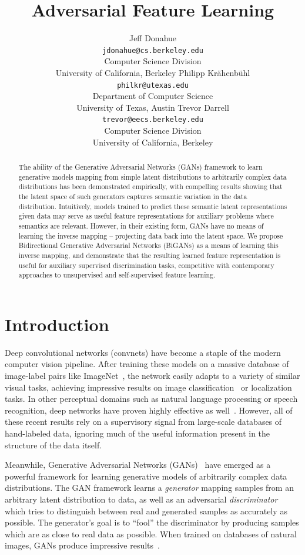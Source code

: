 \documentclass{article}
\title{Adversarial Feature Learning}
\author{Jeff Donahue\\
\texttt{jdonahue@cs.berkeley.edu}\\
Computer Science Division\\
University of California, Berkeley
\And
Philipp Kr\"ahenb\"uhl\\
\texttt{philkr@utexas.edu}\\
Department of Computer Science\\
University of Texas, Austin
\And
Trevor Darrell\\
\texttt{trevor@eecs.berkeley.edu}\\
Computer Science Division\\
University of California, Berkeley}
\newcommand{\lblsec}[1]{\label{sec:#1}}
\begin{document}
\maketitle

\begin{abstract}
  The ability of the Generative Adversarial Networks (GANs) framework
  to learn generative models mapping from simple latent distributions
  to arbitrarily complex data distributions has been demonstrated
  empirically, with compelling results showing
  that the latent space of such generators captures semantic variation
  in the data distribution.
  Intuitively, models trained to predict these semantic latent representations
  given data may serve as useful feature representations
  for auxiliary problems where semantics are relevant.
  However, in their existing form, GANs have no means of learning the inverse mapping --
  projecting data back into the latent space.
  We propose Bidirectional Generative Adversarial Networks (BiGANs) as a means of
  learning this inverse mapping,
  and demonstrate that the resulting learned feature representation
  is useful for auxiliary supervised discrimination tasks, competitive with contemporary
  approaches to unsupervised and self-supervised feature learning.
\end{abstract}

\section{Introduction}
\lblsec{intro}
Deep convolutional networks (convnets)
have become a staple of the modern computer vision pipeline.
After training these models on a massive database of image-label pairs like ImageNet~\citep{imagenet}, the network easily adapts to a variety of similar visual tasks, achieving impressive results on image classification~\citep{decaf,zf,astounding} or localization~\citep{rcnn,fcn} tasks.
In other perceptual domains such as natural language processing or speech recognition, deep networks have proven highly effective as well~\citep{bengiotranslate,orioltranslate,oriolparse,graves}.
However, all of these recent results rely on a supervisory signal from large-scale databases of hand-labeled data, ignoring much of the useful information present in the structure of the data itself.

Meanwhile, Generative Adversarial Networks (GANs)~\citep{gan} have emerged as a powerful framework for learning generative models of arbitrarily complex data distributions.
The GAN framework learns a \textit{generator} mapping samples from an arbitrary latent distribution to data, as well as an adversarial \textit{discriminator} which tries to distinguish between real and generated samples as accurately as possible.
The generator's goal is to ``fool'' the discriminator by producing samples which are as close to real data as possible.
When trained on databases of natural images, GANs produce impressive results~\citep{dcgan,lapgan}.
\end{document}
